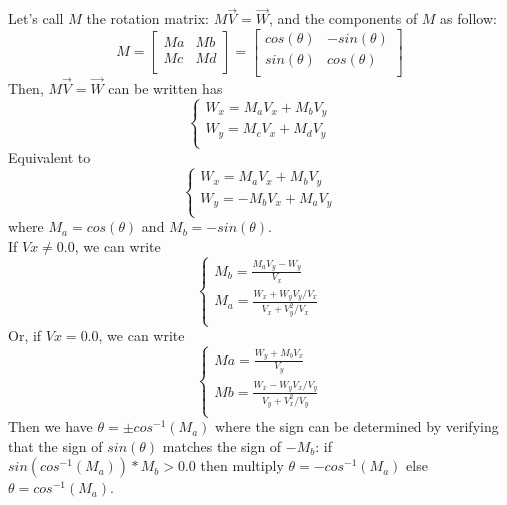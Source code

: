 Let's call $M$ the rotation matrix: $M\vec{V}=\vec{W}$, and the components of $M$ as follow:
\begin{equation}
M=\left[
\begin{array}{cc}
Ma&Mb\\
Mc&Md\\
\end{array}
\right]=\left[
\begin{array}{cc}
cos(\theta)&-sin(\theta)\\
sin(\theta)&cos(\theta)\\
\end{array}
\right]
\end{equation}
Then, $M\vec{V}=\vec{W}$ can be written has 
\begin{equation}
\left\lbrace
\begin{array}{l}
W_x = M_aV_x+M_bV_y\\
W_y = M_cV_x+M_dV_y\\
\end{array}
\right.
\end{equation}
Equivalent to
\begin{equation}
\left\lbrace
\begin{array}{l}
W_x = M_aV_x+M_bV_y\\
W_y = -M_bV_x+M_aV_y\\
\end{array}
\right.
\end{equation}
where $M_a=cos(\theta)$ and $M_b=-sin(\theta)$.\\
If $Vx\neq0.0$, we can write
\begin{equation}
\left\lbrace
\begin{array}{l}
M_b = \frac{M_aV_y-W_y}{V_x}\\
M_a = \frac{W_x+W_yV_y/V_x}{V_x+V_y^2/V_x}\\
\end{array}
\right.
\end{equation}
Or, if $Vx=0.0$, we can write
\begin{equation}
\left\lbrace
\begin{array}{l}
Ma = \frac{W_y+M_bV_x}{V_y}\\
Mb = \frac{W_x-W_yV_x/V_y}{V_y+V_x^2/V_y}\\
\end{array}
\right.
\end{equation}
Then we have $\theta=\pm cos^{-1}(M_a)$ where the sign can be determined by verifying that the sign of $sin(\theta)$ matches the sign of $-M_b$: if $sin(cos^{-1}(M_a))*M_b > 0.0$ then multiply $\theta=-cos^{-1}(M_a)$ else $\theta=cos^{-1}(M_a)$.

